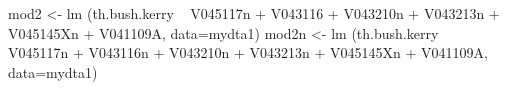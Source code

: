 \begin{Schunk}
\begin{Sinput}
 mod2 <- lm (th.bush.kerry ~ V045117n + V043116 + V043210n + V043213n + V045145Xn + V041109A, data=mydta1) 
 mod2n <- lm (th.bush.kerry ~ V045117n + V043116n + V043210n + V043213n + V045145Xn + V041109A, data=mydta1) 
\end{Sinput}
\end{Schunk}

